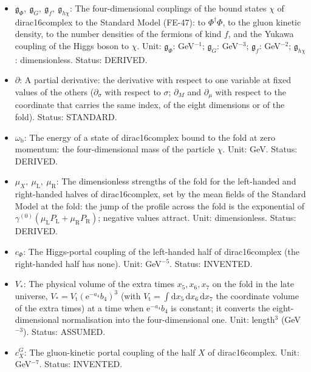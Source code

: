 \documentclass[
  10pt,
]{article}
\providecommand{\tightlist}{%
  \setlength{\itemsep}{0pt}\setlength{\parskip}{0pt}}
\begin{document}
\begin{itemize}
\tightlist
\item
  \(\mathfrak{g}_{\Phi},\ \mathfrak{g}_{G},\ \mathfrak{g}_{f},\ \mathfrak{g}_{h\chi}\):
  The four-dimensional couplings of the bound states \(\chi\) of
  dirac16complex to the Standard Model (FE-47): to \(\Phi^\dagger\Phi\),
  to the gluon kinetic density, to the number densities of the fermions
  of kind \(f\), and the Yukawa coupling of the Higgs boson to \(\chi\).
  Unit: \(\mathfrak{g}_{\Phi}\): GeV\(^{-1}\); \(\mathfrak{g}_{G}\):
  GeV\(^{-3}\); \(\mathfrak{g}_{f}\): GeV\(^{-2}\);
  \(\mathfrak{g}_{h\chi}\): dimensionless. Status: DERIVED.
\item
  \(\partial\): A partial derivative: the derivative with respect to one
  variable at fixed values of the others (\(\partial_\sigma\) with
  respect to \(\sigma\); \(\partial_M\) and \(\partial_\mu\) with
  respect to the coordinate that carries the same index, of the eight
  dimensions or of the fold). Status: STANDARD.
\item
  \(\omega_{\mathrm{b}}\): The energy of a state of dirac16complex bound
  to the fold at zero momentum: the four-dimensional mass of the
  particle \(\chi\). Unit: GeV. Status: DERIVED.
\item
  \(\mu_X,\ \mu_{\mathrm{L}},\ \mu_{\mathrm{R}}\): The dimensionless
  strengths of the fold for the left-handed and right-handed halves of
  dirac16complex, set by the mean fields of the Standard Model at the
  fold: the jump of the profile across the fold is the exponential of
  \(\gamma^{(0)}(\mu_{\mathrm{L}}P_{\mathrm{L}} + \mu_{\mathrm{R}}P_{\mathrm{R}})\);
  negative values attract. Unit: dimensionless. Status: DERIVED.
\item
  \(c_\Phi\): The Higgs-portal coupling of the left-handed half of
  dirac16complex (the right-handed half has none). Unit: GeV\(^{-5}\).
  Status: INVENTED.
\item
  \(V_*\): The physical volume of the extra times \(x_5, x_6, x_7\) on
  the fold in the late universe,
  \(V_* = V_{\mathrm{t}}(\mathrm{e}^{-a_4}b_4)^3\) (with
  \(V_{\mathrm{t}} = \int\mathrm{d}x_5\,\mathrm{d}x_6\,\mathrm{d}x_7\)
  the coordinate volume of the extra times) at a time when
  \(\mathrm{e}^{-a_4}b_4\) is constant; it converts the
  eight-dimensional normalisation into the four-dimensional one. Unit:
  length\(^3\) (GeV\(^{-3}\)). Status: ASSUMED.
\item
  \(c^{G}_X\): The gluon-kinetic portal coupling of the half \(X\) of
  dirac16complex. Unit: GeV\(^{-7}\). Status: INVENTED.

\end{itemize}
\end{document}
